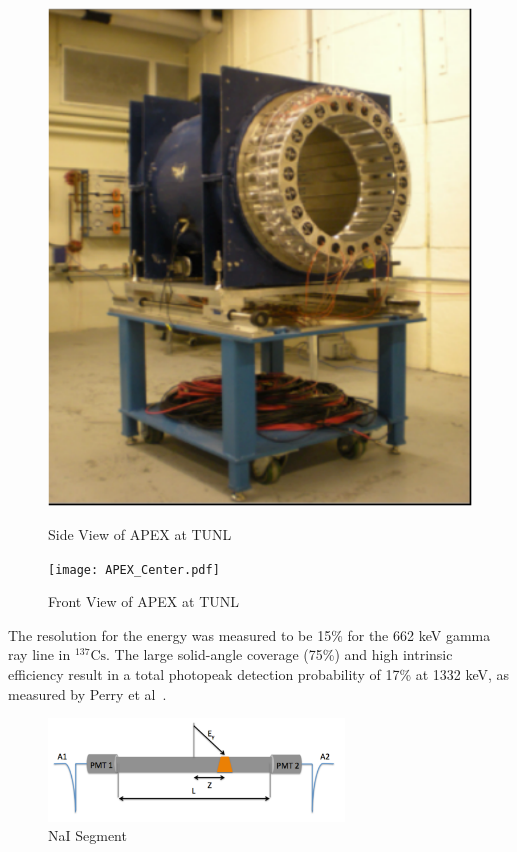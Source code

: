  \begin{figure}[!htb]
     \centering
     \begin{minipage}{.5\textwidth}
         \centering
         \includegraphics[width=0.6\linewidth]{APEX_Array.pdf}
         \caption{Side View of APEX at TUNL}
     \end{minipage}%
     \begin{minipage}{0.5\textwidth}
       \centering
       \texttt{[image: APEX\_Center.pdf]}
       \caption{Front View of APEX at TUNL}
     \end{minipage}
 \end{figure}

 The resolution for the energy was measured to be 15\% for the 662 keV gamma ray line in $\mathrm{{}^{137}{Cs}}$. The large solid-angle coverage (75\%) and high intrinsic efficiency result in a total photopeak detection probability of 17\% at 1332 keV, as measured by Perry et al~\cite{2003NIMPA.505...85P}. 

 \begin{figure}[H]
 \includegraphics[width=0.7\textwidth,center]{NaI_Bar.pdf}
 \caption{NaI Segment}
 \end{figure}

